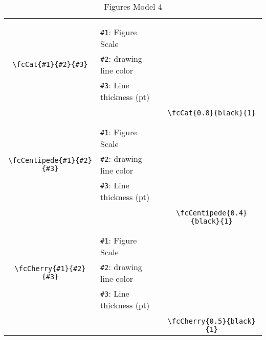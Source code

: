 \documentclass[x11names]{article}
\begin{document}
\begin{table}[H]
\begin{tabular}{|c|l|c|}
	&&\multirow{5}{*}{\fcCat{0.8}{black}{1}}\\	&&\\	&\verb|#1|: Figure Scale &\\	\verb|\fcCat{#1}{#2}{#3}|&	\verb|#2|: drawing line color &\\	&\verb|#3|: Line thickness (pt) &\\ &&\\&&	\verb|\fcCat{0.8}{black}{1}|\\\hline 	
	&&\multirow{5}{*}{\fcCentipede{0.4}{black}{1}}\\	&&\\	&\verb|#1|: Figure Scale &\\	\verb|\fcCentipede{#1}{#2}{#3}|&	\verb|#2|: drawing line color &\\	&\verb|#3|: Line thickness (pt) &\\ &&\\&&	\verb|\fcCentipede{0.4}{black}{1}|\\\hline 	
	&&\multirow{5}{*}{\fcCherry{0.5}{black}{1}}\\	&&\\	&\verb|#1|: Figure Scale &\\	\verb|\fcCherry{#1}{#2}{#3}|&	\verb|#2|: drawing line color &\\	&\verb|#3|: Line thickness (pt) &\\ &&\\&&	\verb|\fcCherry{0.5}{black}{1}|\\\hline 	\hline\end{tabular}\caption{Figures Model 4}\label{tab4}\end{table}
\end{document}
